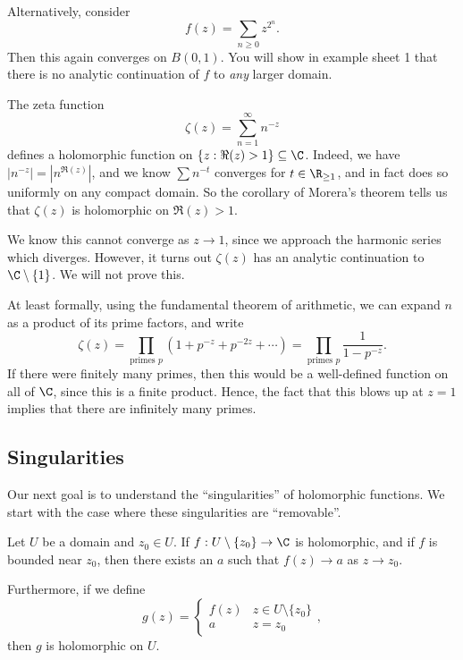 \documentclass[a4paper]{article}
\begin{document}
\begin{eg}
  Alternatively, consider
  \[
    f(z) = \sum_{n \geq 0} z^{2^n}.
  \]
  Then this again converges on $B(0, 1)$. You will show in example sheet 1 that there is no analytic continuation of $f$ to \emph{any} larger domain.
\end{eg}

\begin{eg}
  The zeta function
  \[
    \zeta(z) = \sum_{n = 1}^\infty n^{-z}
  \]
  defines a holomorphic function on $\{z: \Re(z) > 1\} \subseteq \C$. Indeed, we have $|n^{-z}| = |n^{\Re(z)}|$, and we know $\sum n^{-t}$ converges for $t \in \R_{\geq 1}$, and in fact does so uniformly on any compact domain. So the corollary of Morera's theorem tells us that $\zeta(z)$ is holomorphic on $\Re(z) > 1$.

  We know this cannot converge as $z \to 1$, since we approach the harmonic series which diverges. However, it turns out $\zeta(z)$ has an analytic continuation to $\C \setminus \{1\}$. We will not prove this.

  At least formally, using the fundamental theorem of arithmetic, we can expand $n$ as a product of its prime factors, and write
  \[
    \zeta(z) = \prod_{\text{primes }p} (1 + p^{-z} + p^{-2z} + \cdots) = \prod_{\text{primes }p} \frac{1}{1 - p^{-z}}.
  \]
  If there were finitely many primes, then this would be a well-defined function on all of $\C$, since this is a finite product. Hence, the fact that this blows up at $z = 1$ implies that there are infinitely many primes.
\end{eg}

\subsection{Singularities}
Our next goal is to understand the ``singularities'' of holomorphic functions. We start with the case where these singularities are ``removable''.
\begin{prop}
  Let $U$ be a domain and $z_0 \in U$. If $f: U \setminus \{z_0\} \to \C$ is holomorphic, and if $f$ is bounded near $z_0$, then there exists an $a$ such that $f(z) \to a$ as $z \to z_0$.

  Furthermore, if we define
  \[
    g(z) =
    \begin{cases}
      f(z) & z \in U \setminus \{z_0\}\\
      a & z = z_0
    \end{cases},
  \]
  then $g$ is holomorphic on $U$.
\end{prop}
\end{document}

